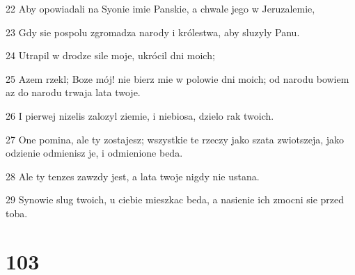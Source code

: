 \par 22 Aby opowiadali na Syonie imie Panskie, a chwale jego w Jeruzalemie,
\par 23 Gdy sie pospolu zgromadza narody i królestwa, aby sluzyly Panu.
\par 24 Utrapil w drodze sile moje, ukrócil dni moich;
\par 25 Azem rzekl; Boze mój! nie bierz mie w polowie dni moich; od narodu bowiem az do narodu trwaja lata twoje.
\par 26 I pierwej nizelis zalozyl ziemie, i niebiosa, dzielo rak twoich.
\par 27 One pomina, ale ty zostajesz; wszystkie te rzeczy jako szata zwiotszeja, jako odzienie odmienisz je, i odmienione beda.
\par 28 Ale ty tenzes zawzdy jest, a lata twoje nigdy nie ustana.
\par 29 Synowie slug twoich, u ciebie mieszkac beda, a nasienie ich zmocni sie przed toba.

\chapter{103}

